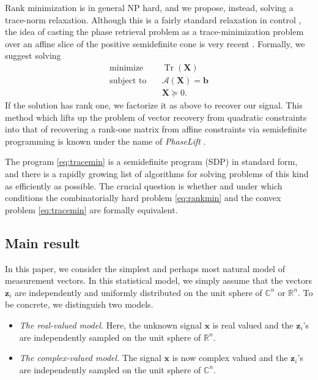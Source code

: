 \documentclass[11pt]{article}
\newcommand{\R}{\mathbb{R}}
\newcommand{\C}{\mathbb{C}}
\newcommand{\<}{\langle}
\renewcommand{\>}{\rangle}
\newcommand{\bx}{\bm{x}}
\newcommand{\bX}{\bm{X}}
\newcommand{\bb}{\bm{b}}
\newcommand{\bz}{\bm{z}}
\newcommand{\tr}{\operatorname{Tr}}
\numberwithin{equation}{section}
\newcommand{\cA}{\mathcal{A}}
\begin{document}
Rank minimization is in general NP hard, and we propose, instead,
solving a trace-norm relaxation. Although this is a fairly standard
relaxation in control \cite{Beck98,Mesbahi97}, the idea of casting the
phase retrieval problem as a trace-minimization problem over an
affine slice of the positive semidefinite cone is very recent
\cite{CMP10,CESV}. Formally, we suggest solving
\begin{equation}
\label{eq:tracemin}
 \begin{array}{ll}
    \text{minimize}   & \quad \tr(\bX)\\ 
    \text{subject to} & \quad  \cA(\bX) = \bb\\
& \quad \bX \succeq 0. 
\end{array}
\end{equation}
If the solution has rank one, we factorize it as above to recover our
signal. This method which lifts up the problem of vector recovery from
quadratic constraints into that of recovering a rank-one matrix from
affine constraints via semidefinite programming is known under the
name of {\em PhaseLift} \cite{CESV}.


The program \eqref{eq:tracemin} is a semidefinite program (SDP) in
standard form, and there is a rapidly growing list of algorithms for
solving problems of this kind as efficiently as possible.  The crucial
question is whether and under which conditions the combinatorially
hard problem \eqref{eq:rankmin} and the convex problem
\eqref{eq:tracemin} are formally equivalent.


\subsection{Main result}
\label{sec:mainresult}

In this paper, we consider the simplest and perhaps most natural model
of measurement vectors. In this statistical model, we simply assume
that the vectors $\bz_i$ are independently and uniformly distributed on
the unit sphere of $\C^n$ or $\R^n$. To be concrete, we distinguish
two models. 
\begin{itemize}
\item {\em The real-valued model.} Here, the unknown signal $\bx$ is
  real valued and the $\bz_i$'s are independently sampled on the unit
  sphere of $\R^n$. %
\item {\em The complex-valued model.} The signal $\bx$ is now complex
  valued and the $\bz_i$'s are independently sampled on the unit sphere
  of $\C^n$.
\end{itemize}
\end{document}
